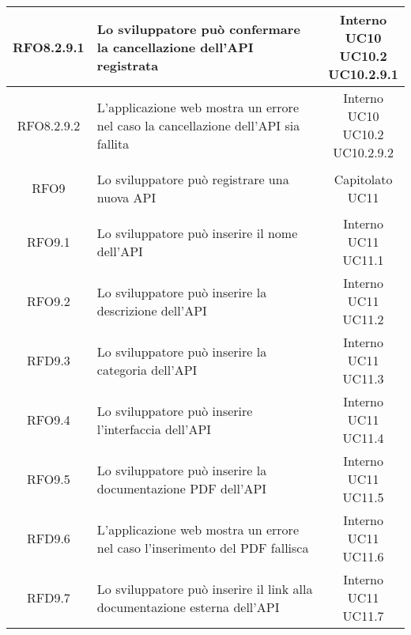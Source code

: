 \begin{longtable}{|c|p{8cm}|c|}
\hypertarget{RFO8.2.9.1}{RFO8.2.9.1} & Lo sviluppatore può confermare la cancellazione dell'API registrata & \makecell*{Interno\\UC10\\UC10.2\\UC10.2.9.1} \\
\hline
\hypertarget{RFO8.2.9.2}{RFO8.2.9.2} & L'applicazione web mostra un errore nel caso la cancellazione dell'API sia fallita & \makecell*{Interno\\UC10\\UC10.2\\UC10.2.9.2} \\
\hline

\hypertarget{RFO9}{RFO9} & Lo sviluppatore può registrare una nuova API & \makecell*{Capitolato\\UC11} \\
\hline

\hypertarget{RFO9.1}{RFO9.1} & Lo sviluppatore può inserire il nome dell'API & \makecell*{Interno\\UC11\\UC11.1} \\
\hline
\hypertarget{RFO9,2}{RFO9.2} & Lo sviluppatore può inserire la descrizione dell'API & \makecell*{Interno\\UC11\\UC11.2} \\
\hline
\hypertarget{RFD9.3}{RFD9.3} & Lo sviluppatore può inserire la categoria dell'API & \makecell*{Interno\\UC11\\UC11.3} \\
\hline
\hypertarget{RFO9.4}{RFO9.4} & Lo sviluppatore può inserire l'interfaccia dell'API & \makecell*{Interno\\UC11\\UC11.4} \\
\hline
\hypertarget{RFO9.5}{RFO9.5} & Lo sviluppatore può inserire la documentazione PDF dell'API & \makecell*{Interno\\UC11\\UC11.5} \\
\hline
\hypertarget{RFD9.6}{RFD9.6} & L'applicazione web mostra un errore nel caso l'inserimento del PDF fallisca & \makecell*{Interno\\UC11\\UC11.6} \\
\hline
\hypertarget{RFD9.7}{RFD9.7} & Lo sviluppatore può inserire il link alla documentazione esterna dell'API & \makecell*{Interno\\UC11\\UC11.7} \\
\hline


\end{longtable}
